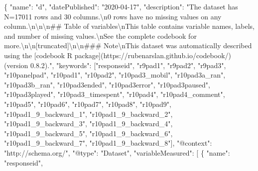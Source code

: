 \documentclass[
]{book}
\newenvironment{Shaded}{\begin{snugshade}}{\end{snugshade}}
\newcommand{\CharTok}[1]{\textcolor[rgb]{0.31,0.60,0.02}{#1}}
\newcommand{\DataTypeTok}[1]{\textcolor[rgb]{0.13,0.29,0.53}{#1}}
\newcommand{\FunctionTok}[1]{\textcolor[rgb]{0.00,0.00,0.00}{#1}}
\newcommand{\OtherTok}[1]{\textcolor[rgb]{0.56,0.35,0.01}{#1}}
\newcommand{\StringTok}[1]{\textcolor[rgb]{0.31,0.60,0.02}{#1}}
\begin{document}
\begin{Shaded}
\begin{Highlighting}[]
\FunctionTok{\{}
  \DataTypeTok{"name"}\FunctionTok{:} \StringTok{"d"}\FunctionTok{,}
  \DataTypeTok{"datePublished"}\FunctionTok{:} \StringTok{"2020-04-17"}\FunctionTok{,}
  \DataTypeTok{"description"}\FunctionTok{:} \StringTok{"The dataset has N=17011 rows and 30 columns.}\CharTok{\textbackslash{}n}\StringTok{0 rows have no missing values on any column.}\CharTok{\textbackslash{}n\textbackslash{}n\textbackslash{}n}\StringTok{## Table of variables}\CharTok{\textbackslash{}n}\StringTok{This table contains variable names, labels, and number of missing values.}\CharTok{\textbackslash{}n}\StringTok{See the complete codebook for more.}\CharTok{\textbackslash{}n\textbackslash{}n}\StringTok{[truncated]}\CharTok{\textbackslash{}n\textbackslash{}n}\StringTok{### Note}\CharTok{\textbackslash{}n}\StringTok{This dataset was automatically described using the [codebook R package](https://rubenarslan.github.io/codebook/) (version 0.8.2)."}\FunctionTok{,}
  \DataTypeTok{"keywords"}\FunctionTok{:} \OtherTok{[}\StringTok{"responseid"}\OtherTok{,} \StringTok{"r9pad1"}\OtherTok{,} \StringTok{"r9pad2"}\OtherTok{,} \StringTok{"r9pad3"}\OtherTok{,} \StringTok{"r10panelpad"}\OtherTok{,} \StringTok{"r10pad1"}\OtherTok{,} \StringTok{"r10pad2"}\OtherTok{,} \StringTok{"r10pad3_mobil"}\OtherTok{,} \StringTok{"r10pad3a_ran"}\OtherTok{,} \StringTok{"r10pad3b_ran"}\OtherTok{,} \StringTok{"r10pad3ended"}\OtherTok{,} \StringTok{"r10pad3error"}\OtherTok{,} \StringTok{"r10pad3paused"}\OtherTok{,} \StringTok{"r10pad3played"}\OtherTok{,} \StringTok{"r10pad3_timespent"}\OtherTok{,} \StringTok{"r10pad4"}\OtherTok{,} \StringTok{"r10pad4_comment"}\OtherTok{,} \StringTok{"r10pad5"}\OtherTok{,} \StringTok{"r10pad6"}\OtherTok{,} \StringTok{"r10pad7"}\OtherTok{,} \StringTok{"r10pad8"}\OtherTok{,} \StringTok{"r10pad9"}\OtherTok{,} \StringTok{"r10pad1_9_backward_1"}\OtherTok{,} \StringTok{"r10pad1_9_backward_2"}\OtherTok{,} \StringTok{"r10pad1_9_backward_3"}\OtherTok{,} \StringTok{"r10pad1_9_backward_4"}\OtherTok{,} \StringTok{"r10pad1_9_backward_5"}\OtherTok{,} \StringTok{"r10pad1_9_backward_6"}\OtherTok{,} \StringTok{"r10pad1_9_backward_7"}\OtherTok{,} \StringTok{"r10pad1_9_backward_8"}\OtherTok{]}\FunctionTok{,}
  \DataTypeTok{"@context"}\FunctionTok{:} \StringTok{"http://schema.org/"}\FunctionTok{,}
  \DataTypeTok{"@type"}\FunctionTok{:} \StringTok{"Dataset"}\FunctionTok{,}
  \DataTypeTok{"variableMeasured"}\FunctionTok{:} \OtherTok{[}
    \FunctionTok{\{}
      \DataTypeTok{"name"}\FunctionTok{:} \StringTok{"responseid"}\FunctionTok{,}

\end{Highlighting}
\end{Shaded}
\end{document}
